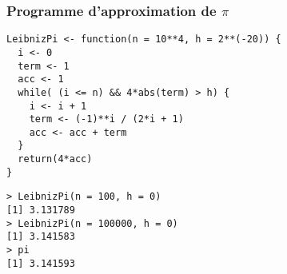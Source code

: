 \documentclass[10pt]{beamer}
\begin{document}
\begin{frame}[fragile]
  \frametitle{Programme d'approximation de $\pi$}
  \begin{lstlisting}[style=editor]
LeibnizPi <- function(n = 10**4, h = 2**(-20)) {
  i <- 0
  term <- 1
  acc <- 1
  while( (i <= n) && 4*abs(term) > h) {
    i <- i + 1
    term <- (-1)**i / (2*i + 1)
    acc <- acc + term
  }
  return(4*acc)
}
\end{lstlisting}

\begin{lstlisting}
> LeibnizPi(n = 100, h = 0)
[1] 3.131789
> LeibnizPi(n = 100000, h = 0)
[1] 3.141583
> pi
[1] 3.141593  
\end{lstlisting}

\end{frame}
\end{document}
